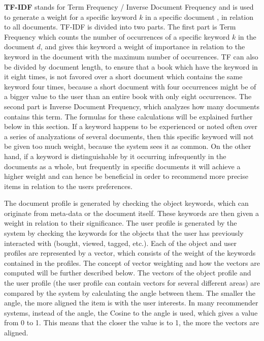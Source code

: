 \textbf{TF-IDF} stands for Term Frequency / Inverse Document Frequency and is used to generate a weight for a specific keyword \(k\) in a specific document \(\), in relation to all documents. TF-IDF is divided into two parts.\newline
The first part is Term Frequency which counts the number of occurrences of a specific keyword \(k\) in the document \(d\), and gives this keyword a weight of importance in relation to the keyword in the document with the maximum number of occurrences. TF can also be divided by document length, to ensure that a book which have the keyword in it eight times, is not favored over a short document which contains the same keyword four times, because a short document with four occurrences might be of a bigger value to the user than an entire book with only eight occurrences.\newline
The second part is Inverse Document Frequency, which analyzes how many documents contains this term. The formulas for these calculations will be explained further below in this section. \newline
If a keyword happens to be experienced or noted often over a series of analyzations of several documents, then this specific keyword will not be given too much weight, because the system sees it as common. On the other hand, if a keyword is distinguishable by it occurring infrequently in the documents as a whole, but frequently in specific documents it will achieve a higher weight and can hence be beneficial in order to recommend more precise items in relation to the users preferences.\newline {}

The document profile is generated by checking the object keywords, which can originate from meta-data or the document itself. These keywords are then given a weight in relation to their significance.
The user profile is generated by the system by checking the keywords for the objects that the user has previously interacted with (bought, viewed, tagged, etc.). Each of the object and user profiles are represented by a vector, which consists of the weight of the keywords contained in the profiles. The concept of vector weighting and how the vectors are computed will be further described below.
The vectors of the object profile and the user profile (the user profile can contain vectors for several different areas) are compared by the system by calculating the angle between them. The smaller the angle, the more aligned the item is with the user interests. In many recommender systems, instead of the angle, the Cosine to the angle is used, which gives a value from 0 to 1. This means that the closer the value is to 1, the more the vectors are aligned.\newline

